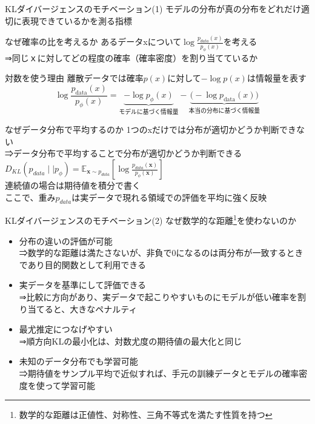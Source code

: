 \begin{frame}[shrink]{KLダイバージェンスのモチベーション(1)}
    モデルの分布が真の分布をどれだけ適切に表現できているかを測る指標
    \begin{block}{なぜ確率の比を考えるか}
    あるデータxについて$\log \frac{p_{data}(x)}{p_{\phi}(x)}$を考える\\
    ⇒同じｘに対してどの程度の確率（確率密度）を割り当てているか\\
    \end{block}
    \begin{block}{対数を使う理由}
        離散データでは確率$p(x)$に対して$-\log p(x)$は情報量を表す\\
    \[
\log\frac{p_{\mathrm{data}}(x)}{p_{\phi}(x)}
=
\underbrace{-\log p_{\phi}(x)}_{\text{モデルに基づく情報量}}
-
\underbrace{\bigl(-\log p_{\mathrm{data}}(x)\bigr)}_{\text{本当の分布に基づく情報量}}
\]
    \end{block}

    \begin{block}{なぜデータ分布で平均するのか}
        1つのxだけでは分布が適切かどうか判断できない\\
        ⇒データ分布で平均することで分布が適切かどうか判断できる\\
        \centering$D_{KL}(p_{data}\mid\mid p_{\phi})=\mathbb{E}_{\boldsymbol{x}\sim p_{data}}[\log \frac{p_{data}(\boldsymbol{x})}{p_{\phi}(\boldsymbol{x})}]$\\
        連続値の場合は期待値を積分で書く\\
        ここで、重み$p_{data}$は実データで現れる領域での評価を平均に強く反映
    \end{block}

\end{frame}
\begin{frame}{KLダイバージェンスのモチベーション(2)}
    なぜ数学的な距離\footnote{数学的な距離は正値性、対称性、三角不等式を満たす性質を持つ}を使わないのか
    \begin{itemize}
    \item 分布の違いの評価が可能\\
    ⇒数学的な距離は満たさないが、非負で0になるのは両分布が一致するときであり目的関数として利用できる\\
    \item 実データを基準にして評価できる\\
    ⇒比較に方向があり、実データで起こりやすいものにモデルが低い確率を割り当てると、大きなペナルティ
    \item 最尤推定につなげやすい\\
    ⇒順方向KLの最小化は、対数尤度の期待値の最大化と同じ
    \item 未知のデータ分布でも学習可能\\
    ⇒期待値をサンプル平均で近似すれば、手元の訓練データとモデルの確率密度を使って学習可能

    \end{itemize}

\end{frame}
